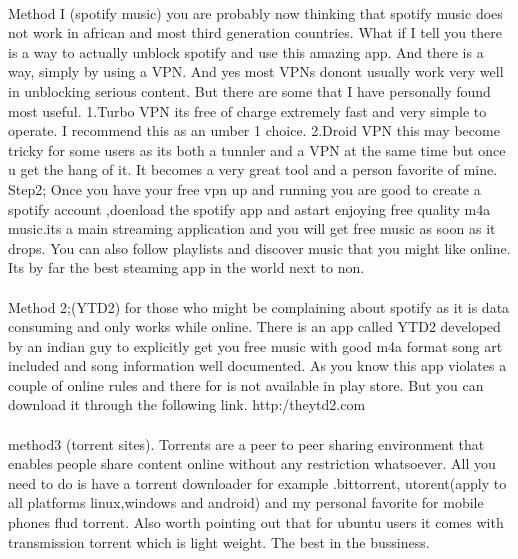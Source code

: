 \documentclass[11pt]{article}
\begin{document}
	\paragraph{}
		Method I (spotify music)
	you are probably now thinking that spotify music does not work in african and most third generation countries.
	What if I tell you there is a way to actually unblock spotify and use this amazing app.
	And there is a way, simply by using a VPN.
	And yes most VPNs donont usually work very well in unblocking serious content. But there are some that I have personally found most useful.
	1.Turbo VPN
	its free of charge extremely fast and very simple to operate.
	I recommend this as an umber 1 choice.
	2.Droid VPN
	this may become tricky for some users as its both a tunnler and a VPN at the same time but once u get the hang of it. It becomes a very great tool and a person favorite of mine.
	Step2;
	Once you have your free vpn up and running you are good to create a spotify account ,doenload the spotify app and astart enjoying free quality m4a music.its a main streaming application and you will get free music as soon as it drops.
	You can also follow playlists and discover music that you might like online.
	Its by far the best steaming app in the world next to non.
	\paragraph{}
	Method 2;(YTD2)
	for those who might be complaining about spotify as it is data consuming and only works while online.
	There is an app called YTD2 developed by an indian guy to explicitly get you free music with good m4a format song art included and song information well documented.
	As you know this app violates a couple of online rules and there for is not available in play store.
	But you can download it through the following link.
	http:/theytd2.com
	
	\paragraph{}
	method3 (torrent sites).
	Torrents are a peer to peer sharing environment that enables people share content online without any restriction whatsoever.
	All you need to do is have a torrent downloader for example .bittorrent, utorent(apply to all platforms linux,windows and android) and my personal favorite for mobile phones flud torrent.
	Also worth pointing out that for ubuntu users it comes with transmission torrent which is light weight. The best in the bussiness.
	
\end{document}
